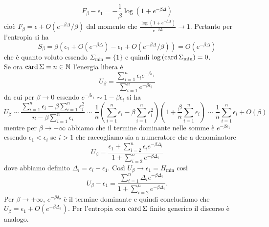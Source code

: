 \begin{solution}
    \[
        F_\beta - \epsilon_1 = - \frac{1}{\beta} \log{(1+e^{-\beta\Delta})}
    \]
    cioè $ F_\beta = \epsilon + O(e^{-\beta\Delta}/\beta) $ dal momento che $ \frac{\log{(1+e^{-\beta\Delta})}}{e^{-\beta\Delta}} \to 1 $. Pertanto per l'entropia si ha
    \[
        S_\beta = \beta(\epsilon_1 + O(e^{-\beta\Delta}) - \epsilon_1 + O(e^{-\beta\Delta}/\beta)) = O(e^{-\beta\Delta})
    \]
    che è quanto voluto essendo $ \Sigma_\mathrm{min} = \{1\} $ e quindi $ \log{(\operatorname{card}{\Sigma_\mathrm{min}})} = 0 $. \\
    Se ora $ \operatorname{card}{\Sigma} = n \in \mathbb{N} $ l'energia libera è
    \[
        U_\beta = \frac{\sum_{i=1}^{n} \epsilon_i e^{-\beta\epsilon_i}}{\sum_{i=1}^{n}e^{-\beta\epsilon_i}}
    \]
    da cui per $ \beta \to 0 $ essendo $ e^{-\beta\epsilon_i} \sim 1 - \beta\epsilon_i $ si ha
    \[
        U_\beta \sim \frac{\sum_{i=1}^{n} \epsilon_i - \beta \sum_{i=1}^{n} \epsilon_i^2}{n -\beta \sum_{i=1}^{n} \epsilon_i} \sim \frac{1}{n} \left(\sum_{i=1}^{n}\epsilon_i - \beta \sum_{i=1}^{n} \epsilon_i^2\right)\left(1 + \frac{\beta}{n}\sum_{i=1}^{n} \epsilon_i\right) \sim \frac{1}{n} \sum_{i=1}^{n}\epsilon_i + O(\beta)
    \]
    mentre per $ \beta \to +\infty $ abbiamo che il termine dominante nelle somme è $ e^{-\beta\epsilon_1} $ essendo $ \epsilon_1 < \epsilon_i $ se $ i > 1 $ che raccogliamo sia a numeratore che a denominatore
    \[
        U_\beta = \frac{\epsilon_1 + \sum_{i=2}^{n}\epsilon_i e^{-\beta\Delta_i}}{1 + \sum_{i=2}^{n}e^{-\beta\Delta_i}}
    \]
    dove abbiamo definito $ \Delta_i = \epsilon_i - \epsilon_1 $. Così $ U_\beta \to \epsilon_1 = H_{\mathrm{min}} $ così
    \[
        U_\beta - \epsilon_1 = \frac{\sum_{i=1}^{n} \Delta_i e^{-\beta\Delta_i}}{1+\sum_{i=2}^{n}e^{-\beta\Delta_i}}.
    \]
    Per $ \beta \to +\infty $, $ e^{-\beta\delta_2} $ è il termine dominante e  quindi concludiamo che $ U_\beta = \epsilon_1 + O(e^{-\beta\Delta_2}) $. Per l'entropia con $ \operatorname{card}{\Sigma} $ finito generico il discorso è analogo.
\end{solution}
